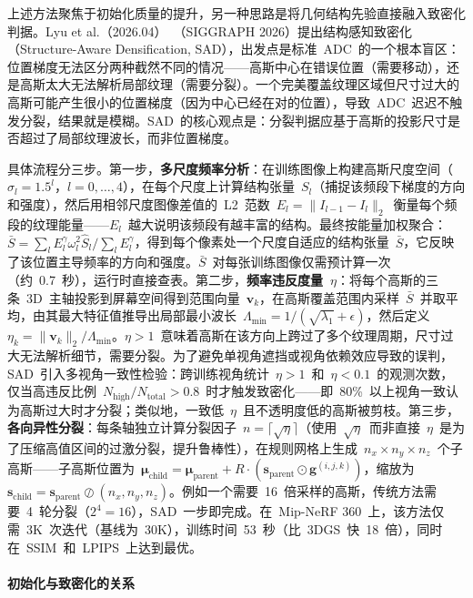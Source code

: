 上述方法聚焦于初始化质量的提升，另一种思路是将几何结构先验直接融入致密化判据。Lyu et al.（2026.04）~\cite{2604_28016}（SIGGRAPH 2026）提出结构感知致密化（Structure-Aware Densification, SAD），出发点是标准~ADC~的一个根本盲区：位置梯度无法区分两种截然不同的情况——高斯中心在错误位置（需要移动），还是高斯太大无法解析局部纹理（需要分裂）。一个完美覆盖纹理区域但尺寸过大的高斯可能产生很小的位置梯度（因为中心已经在对的位置），导致~ADC~迟迟不触发分裂，结果就是模糊。SAD~的核心观点是：分裂判据应基于高斯的投影尺寸是否超过了局部纹理波长，而非位置梯度。

具体流程分三步。第一步，\textbf{多尺度频率分析}：在训练图像上构建高斯尺度空间（$\sigma_l = 1.5^l$，$l=0,\ldots,4$），在每个尺度上计算结构张量~$S_l$（捕捉该频段下梯度的方向和强度），然后用相邻尺度图像差值的~L2~范数~$E_l = \|I_{l-1} - I_l\|_2$~衡量每个频段的纹理能量——$E_l$~越大说明该频段有越丰富的结构。最终按能量加权聚合：$\bar{S} = \sum_l E_l^\gamma \omega_l^2 \hat{S}_l / \sum_l E_l^\gamma$，得到每个像素处一个尺度自适应的结构张量~$\bar{S}$，它反映了该位置主导频率的方向和强度。$\bar{S}$~对每张训练图像仅需预计算一次（约~0.7~秒），运行时直接查表。第二步，\textbf{频率违反度量~$\eta$}：将每个高斯的三条~3D~主轴投影到屏幕空间得到范围向量~$\mathbf{v}_k$，在高斯覆盖范围内采样~$\bar{S}$~并取平均，由其最大特征值推导出局部最小波长~$\Lambda_{\min} = 1/(\sqrt{\lambda_1} + \epsilon)$，然后定义~$\eta_k = \|\mathbf{v}_k\|_2 / \Lambda_{\min}$。$\eta > 1$~意味着高斯在该方向上跨过了多个纹理周期，尺寸过大无法解析细节，需要分裂。为了避免单视角遮挡或视角依赖效应导致的误判，SAD~引入多视角一致性检验：跨训练视角统计~$\eta > 1$~和~$\eta < 0.1$~的观测次数，仅当高违反比例~$N_{\text{high}} / N_{\text{total}} > 0.8$~时才触发致密化——即~80\%~以上视角一致认为高斯过大时才分裂；类似地，一致低~$\eta$~且不透明度低的高斯被剪枝。第三步，\textbf{各向异性分裂}：每条轴独立计算分裂因子~$n = \lceil\sqrt{\eta}\rceil$（使用~$\sqrt{\eta}$~而非直接~$\eta$~是为了压缩高值区间的过激分裂，提升鲁棒性），在规则网格上生成~$n_x \times n_y \times n_z$~个子高斯——子高斯位置为~$\boldsymbol{\mu}_{\text{child}} = \boldsymbol{\mu}_{\text{parent}} + R \cdot (\mathbf{s}_{\text{parent}} \odot \mathbf{g}^{(i,j,k)})$，缩放为~$\mathbf{s}_{\text{child}} = \mathbf{s}_{\text{parent}} \oslash (n_x, n_y, n_z)$。例如一个需要~16~倍采样的高斯，传统方法需要~4~轮分裂（$2^4 = 16$），SAD~一步即完成。在~Mip-NeRF 360~上，该方法仅需~3K~次迭代（基线为~30K），训练时间~53~秒（比~3DGS~快~18~倍），同时在~SSIM~和~LPIPS~上达到最优。

\paragraph{初始化与致密化的关系}

